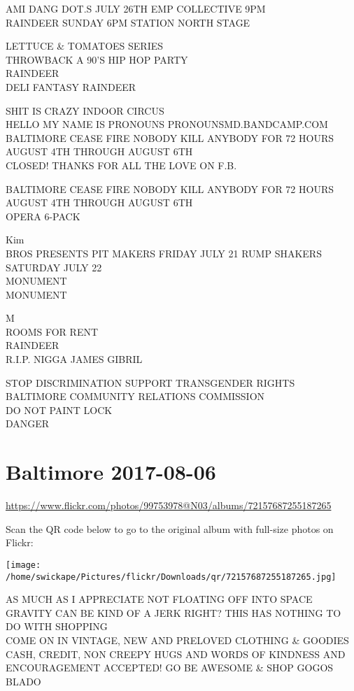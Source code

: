 \documentclass[10pt,letterpaper]{article}
\begin{document}
AMI DANG DOT.S JULY 26TH EMP COLLECTIVE 9PM\\
RAINDEER SUNDAY 6PM STATION NORTH STAGE

LETTUCE \& TOMATOES SERIES\\
THROWBACK A 90'S HIP HOP PARTY\\
RAINDEER\\
DELI FANTASY RAINDEER

SHIT IS CRAZY INDOOR CIRCUS\\
HELLO MY NAME IS PRONOUNS PRONOUNSMD.BANDCAMP.COM\\
BALTIMORE CEASE FIRE NOBODY KILL ANYBODY FOR 72 HOURS AUGUST 4TH THROUGH AUGUST 6TH\\
CLOSED! THANKS FOR ALL THE LOVE ON F.B.

BALTIMORE CEASE FIRE NOBODY KILL ANYBODY FOR 72 HOURS AUGUST 4TH THROUGH AUGUST 6TH\\
OPERA 6{-}PACK

Kim\\
BROS PRESENTS PIT MAKERS FRIDAY JULY 21 RUMP SHAKERS SATURDAY JULY 22\\
MONUMENT\\
MONUMENT

M\\
ROOMS FOR RENT\\
RAINDEER\\
R.I.P. NIGGA JAMES GIBRIL

STOP DISCRIMINATION SUPPORT TRANSGENDER RIGHTS BALTIMORE COMMUNITY RELATIONS COMMISSION\\
DO NOT PAINT LOCK\\
DANGER


\section*{Baltimore 2017-08-06}

\url{https://www.flickr.com/photos/99753978@N03/albums/72157687255187265}

Scan the QR code below to go to the original album with full-size photos on Flickr:

\texttt{[image: /home/swickape/Pictures/flickr/Downloads/qr/72157687255187265.jpg]}


AS MUCH AS I APPRECIATE NOT FLOATING OFF INTO SPACE GRAVITY CAN BE KIND OF A JERK RIGHT?  THIS HAS NOTHING TO DO WITH SHOPPING\\
COME ON IN VINTAGE, NEW AND PRELOVED CLOTHING \& GOODIES CASH, CREDIT, NON CREEPY HUGS AND WORDS OF KINDNESS AND ENCOURAGEMENT ACCEPTED!  GO BE AWESOME \& SHOP GOGOS\\
BLADO
\end{document}
